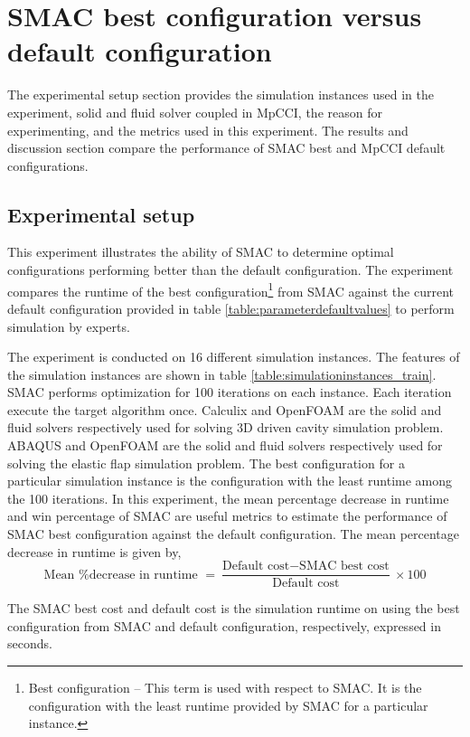 \section{SMAC best configuration versus default configuration}

The experimental setup section provides the simulation instances used in the experiment, solid and fluid solver coupled in MpCCI, the reason for experimenting, and the metrics used in this experiment. The results and discussion section compare the performance of SMAC best and MpCCI default configurations.

\subsection{Experimental setup}
This experiment illustrates the ability of SMAC to determine optimal configurations performing better than the default configuration. The experiment compares the runtime of the best configuration\footnote{Best configuration – This term is used with respect to SMAC. It is the configuration with the least runtime provided by SMAC for a particular instance.} from SMAC against the current default configuration provided in table \ref{table:parameterdefaultvalues} to perform simulation by experts.

The experiment is conducted on 16 different simulation instances. The features of the simulation instances are shown in table \ref{table:simulationinstances_train}. SMAC performs optimization for 100 iterations on each instance. Each iteration execute the target algorithm once. Calculix and OpenFOAM are the solid and fluid solvers respectively used for solving 3D driven cavity simulation problem. ABAQUS and OpenFOAM are the solid and fluid solvers respectively used for solving the elastic flap simulation problem. The best configuration for a particular simulation instance is the configuration with the least runtime among the 100 iterations. In this experiment, the mean percentage decrease in runtime and win percentage of SMAC are useful metrics to estimate the performance of SMAC best configuration against the default configuration. The mean percentage decrease in runtime is given by,
\begin{equation}
\text{Mean \% decrease in runtime } =
\frac{\text{Default cost}-  \text{SMAC best cost}}{\text{Default cost}} \times 100
\label{equation:decreasepercentage}
\end{equation}

The SMAC best cost and default cost is the simulation runtime on using the best configuration from SMAC and default configuration, respectively, expressed in seconds.

